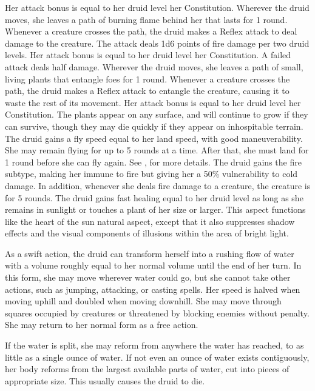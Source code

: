 Her attack bonus is equal to her druid level \add her Constitution.
Wherever the druid moves, she leaves a path of burning flame behind her that lasts for 1 round.
Whenever a creature crosses the path, the druid makes a Reflex attack to deal damage to the creature.
The attack deals 1d6 points of fire damage per two druid levels.
Her attack bonus is equal to her druid level \add her Constitution.
A failed attack deals half damage.
Wherever the druid moves, she leaves a path of small, living plants that entangle foes for 1 round.
Whenever a creature crosses the path, the druid makes a Reflex attack to entangle the creature, causing it to waste the rest of its movement.
Her attack bonus is equal to her druid level \add her Constitution.
The plants appear on any surface, and will continue to grow if they can survive, though they may die quickly if they appear on inhospitable terrain.
The druid gains a fly speed equal to her land speed, with good maneuverability.
She may remain flying for up to 5 rounds at a time.
After that, she must land for 1 round before she can fly again.
See , for more details.
The druid gains the fire subtype, making her immune to fire but giving her a 50\% vulnerability to cold damage.
In addition, whenever she deals fire damage to a creature, the creature is \ignited for 5 rounds.
The druid gains fast healing equal to her druid level as long as she remains in sunlight or touches a plant of her size or larger.
This aspect functions like the heart of the sun natural aspect, except that it also suppresses shadow effects and the visual components of illusions within the area of bright light.

As a swift action, the druid can transform herself into a rushing flow of water with a volume roughly equal to her normal volume until the end of her turn.
In this form, she may move wherever water could go, but she cannot take other actions, such as jumping, attacking, or casting spells.
Her speed is halved when moving uphill and doubled when moving downhill.
She may move through squares occupied by creatures or threatened by blocking enemies without penalty.
She may return to her normal form as a free action.
\par If the water is split, she may reform from anywhere the water has reached, to as little as a single ounce of water.
If not even an ounce of water exists contiguously, her body reforms from the largest available parts of water, cut into pieces of appropriate size.
This usually causes the druid to die.

